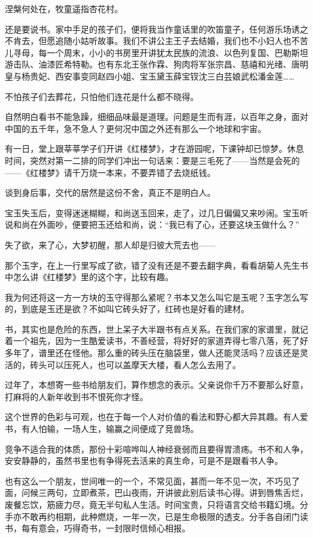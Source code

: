 \par 涅槃何处在，牧童遥指杏花村。
\par 还是要说书。家中手足的孩子们，便将我当作童话里的吹笛童子，任何游乐场诱之不肯去，但愿追随小姑听故事。我们不讲公主王子去结婚，我们也不小妇人也不苦儿寻母，每一个周末，小小的书房里开讲犹太民族的流浪、以色列复国、巴勒斯坦游击队、油漆匠希特勒。也有东北王张作霖、狗肉将军张宗昌、慈禧和光绪、唐明皇与杨贵妃、西安事变同赵四小姐、宝玉黛玉薛宝钗沈三白芸娘武松潘金莲……
\par 不怕孩子们去葬花，只怕他们连花是什么都不晓得。
\par 自然明白看书不能急躁，细细品味最是道理。问题是生而有涯，以百年之身，面对中国的五千年，急不急人？更何况中国之外还有那么一个地球和宇宙。
\par 有一日，堂上跟莘莘学子们开讲《红楼梦》，才在游园呢，下课钟却已惊梦。休息时间，突然对第一二排的同学们冲出一句话来：要是三毛死了——当然是会死的——《红楼梦》请千万烧一本来，不要弄错了去烧纸钱。
\par 谈到身后事，交代的居然是这份不舍，真正不是明白人。
\par 宝玉失玉后，变得迷迷糊糊，和尚送玉回来，走了，过几日偏偏又来吵闹。宝玉听说和尚在外面吵，便要把玉还给和尚，说：“我已有了心，还要这块玉做什么？”
\par 失了欲，来了心，大梦初醒，那人却是归彼大荒去也——
\par 那个玉字，在上一行里写成了欲，错了没有还是不要去翻字典，看看胡菊人先生书中怎么讲《红楼梦》里的这个字，比较有趣。
\par 我为何还将这一方一方块的玉守得那么紧呢？书本又怎么叫它是玉呢？玉字怎么写的，到底是玉还是欲？不如叫它砖头好了，红砖也是好看的建材。
\par 书，其实也是危险的东西，世上呆子大半跟书有点关系。在我们家的家谱里，就记着一个祖先，因为一生酷爱读书，不善经营，将好好的家道弄得七零八落，死了好多年了，谱里还在怪他。那么重的砖头压在脑袋里，做人还能灵活吗？应该还是灵活的，砖头可以压死人，也可以盖摩天大楼，看人怎么去用了。
\par 过年了，本想寄一些书给朋友们，算作想念的表示。父亲说你千万不要那么好意，打麻将的人新年收到书不恨死你才怪。
\par 这个世界的色彩与可观，也在于每一个人对价值的看法和野心都大异其趣。有人爱书，有人怕输，一场人生，输赢之间便成了竞兽场。
\par 竞争不适合我的体质，那份十彩喧哗叫人神经衰弱而且要得胃溃疡。书不和人争，安安静静的，虽然书里也有争得死去活来的真生命，可是不是跟看书人争。
\par 也有这么一个朋友，世间唯一的一个，不常见面，甚而一年不见一次，不巧见了面，问候三两句，立即煮茶，巴山夜雨，开讲彼此别后读书心得。讲到唇焦舌烂，废餐忘饮，筋疲力尽，竟无半句私人生活。时间宝贵，只将语言交给书籍幻境。分手亦不敢再约相期，此种燃烧，一年一次，已是生命极限的透支。分手各自闭门读书，每有意会，巧得奇书，一封限时信倾心相报。
